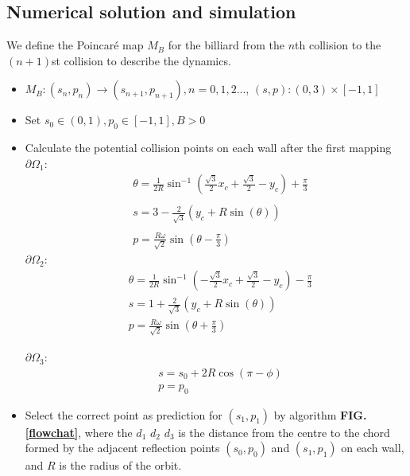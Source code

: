 \documentclass[a0,portrait]{a0poster}
\begin{document}
\begin{multicols}{3}
\section*{Numerical solution and simulation}

\noindent
We define the Poincaré map $M_B$ for the billiard from the $n$th collision to the $(n+1)$st collision to describe the dynamics.
\begin{itemize}
    \item $M_B: (s_n, p_n) \to (s_{n+1},p_{n+1}), n=0, 1, 2...$, $(s,p): (0, 3) \times [-1, 1]$
    \item Set $s_0 \in (0, 1),p_0 \in [-1,1], B>0$
    \item Calculate the potential collision points on each wall after the first mapping\\
$\partial \Omega_1$:
\begin{equation}
\begin{aligned}
& \theta=\frac{1}{2R}\sin^{-1}\left(\frac{\sqrt{3}}{2}x_c+\frac{\sqrt{3}}{2}-y_c\right)+\frac{\pi}{3}\\
\\
& s=3-\frac{2}{\sqrt{3}}(y_c+R\sin(\theta))\\
\\
& p=\frac{R\omega}{\sqrt{2}}\sin\left(\theta-\frac{\pi}{3}\right)
\end{aligned}
\end{equation}
$\partial \Omega_2$:
\begin{equation}
\begin{aligned}
& \theta=\frac{1}{2R}\sin^{-1}\left(-\frac{\sqrt{3}}{2}x_c+\frac{\sqrt{3}}{2}-y_c\right)-\frac{\pi}{3}\\
& s=1+\frac{2}{\sqrt{3}}\left(y_c+R\sin(\theta)\right)\\
& p=\frac{R\omega}{\sqrt{2}}\sin(\theta+\frac{\pi}{3})
\end{aligned}
\end{equation}

$\partial \Omega_3$:
\begin{equation}
\begin{aligned}
& s=s_0+2R\cos(\pi-\phi)\\
& p=p_0
\end{aligned}
\end{equation}
    \item Select the correct point as prediction for $(s_1,p_1)$ by algorithm \textbf{FIG.\ref{flowchat}}, where the $d_1$ $d_2$ $d_3$ is the distance from the centre to the  chord formed by the adjacent reflection points $(s_0,p_0)$ and $(s_1,p_1)$ on each wall, and $R$ is the radius of the orbit.


\end{itemize}
\end{multicols}
\end{document}
